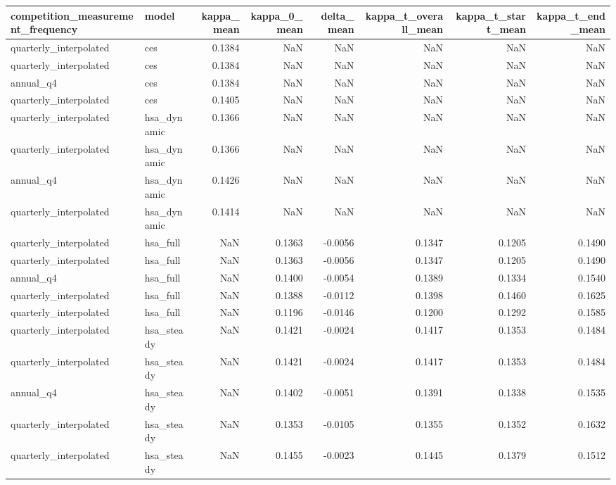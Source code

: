 \begin{tabular}{llrrrrrr}
\toprule
competition\_measurement\_frequency & model & kappa\_mean & kappa\_0\_mean & delta\_mean & kappa\_t\_overall\_mean & kappa\_t\_start\_mean & kappa\_t\_end\_mean \\
\midrule
quarterly\_interpolated & ces & 0.1384 & NaN & NaN & NaN & NaN & NaN \\
quarterly\_interpolated & ces & 0.1384 & NaN & NaN & NaN & NaN & NaN \\
annual\_q4 & ces & 0.1384 & NaN & NaN & NaN & NaN & NaN \\
quarterly\_interpolated & ces & 0.1405 & NaN & NaN & NaN & NaN & NaN \\
quarterly\_interpolated & hsa\_dynamic & 0.1366 & NaN & NaN & NaN & NaN & NaN \\
quarterly\_interpolated & hsa\_dynamic & 0.1366 & NaN & NaN & NaN & NaN & NaN \\
annual\_q4 & hsa\_dynamic & 0.1426 & NaN & NaN & NaN & NaN & NaN \\
quarterly\_interpolated & hsa\_dynamic & 0.1414 & NaN & NaN & NaN & NaN & NaN \\
quarterly\_interpolated & hsa\_full & NaN & 0.1363 & -0.0056 & 0.1347 & 0.1205 & 0.1490 \\
quarterly\_interpolated & hsa\_full & NaN & 0.1363 & -0.0056 & 0.1347 & 0.1205 & 0.1490 \\
annual\_q4 & hsa\_full & NaN & 0.1400 & -0.0054 & 0.1389 & 0.1334 & 0.1540 \\
quarterly\_interpolated & hsa\_full & NaN & 0.1388 & -0.0112 & 0.1398 & 0.1460 & 0.1625 \\
quarterly\_interpolated & hsa\_full & NaN & 0.1196 & -0.0146 & 0.1200 & 0.1292 & 0.1585 \\
quarterly\_interpolated & hsa\_steady & NaN & 0.1421 & -0.0024 & 0.1417 & 0.1353 & 0.1484 \\
quarterly\_interpolated & hsa\_steady & NaN & 0.1421 & -0.0024 & 0.1417 & 0.1353 & 0.1484 \\
annual\_q4 & hsa\_steady & NaN & 0.1402 & -0.0051 & 0.1391 & 0.1338 & 0.1535 \\
quarterly\_interpolated & hsa\_steady & NaN & 0.1353 & -0.0105 & 0.1355 & 0.1352 & 0.1632 \\
quarterly\_interpolated & hsa\_steady & NaN & 0.1455 & -0.0023 & 0.1445 & 0.1379 & 0.1512 \\
\bottomrule
\end{tabular}
